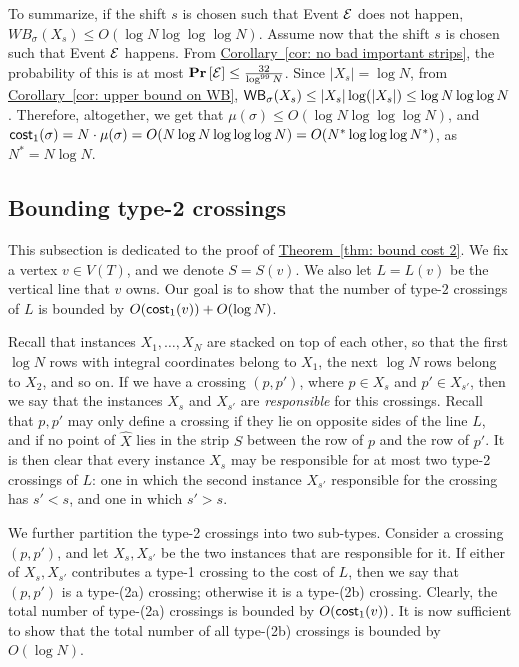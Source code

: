 \documentclass[11pt]{article}
\numberwithin{equation}{section}
\theoremstyle{definition}
\theoremstyle{plain}
\newcommand{\expref}[2]{\hyperref[#2]{#1~\ref{#2}}}
\begin{document}
To summarize, if the shift $s$ is chosen such that Event ${\cal{E}}$ does not happen,  	 $WB_{\sigma}(X_s)\leq O(\log N \log\log\log N)$. Assume now that the shift $s$ is chosen such that Event ${\cal{E}}$ happens. From \expref{Corollary}{cor: no bad important strips}, the probability of this is at most 	 $\text{\bf Pr}\left [{\cal{E}}\right]\leq \frac{32}{\log^{99}N}$. Since $|X_s|=\log N$, from \expref{Corollary}{cor: upper bound on WB}, $\mathsf{WB}_{\sigma}(X_s)\leq |X_s|\log(|X_s|)\leq \log N\log\log N$. Therefore, altogether, we get that $\mu(\sigma)\leq O(\log N\log\log\log N)$, and $\mathsf{cost}_1(\sigma)=N\cdot \mu(\sigma)=O(N\log N\log\log\log N)=O(N^*\log\log\log N^*)$, as $N^*=N\log N$.


%
%
%
\subsection{Bounding type-2 crossings}\label{subsec:type-2} 
%
%
%

This subsection is dedicated to the proof of \expref{Theorem}{thm: bound cost 2}. We fix a vertex $v\in V(T)$, and we denote $S=S(v)$. We also let $L = L(v)$ be the vertical line that $v$ owns. 
Our goal is to show that the number of type-$2$ crossings of $L$ is bounded by $O(\mathsf{cost}_1(v))+O(\log N)$.

Recall that instances $X_1,\ldots,X_N$ are stacked on top of each other, so that the first $\log N$ rows with integral coordinates  belong to $X_1$, the next $\log N$ rows belong to $X_2$, and so on. If we have a crossing $(p,p')$, where $p\in X_s$ and $p'\in X_{s'}$, then we say that the instances $X_s$ and $X_{s'}$ are \emph{responsible} for this crossings. Recall that $p,p'$ may only define a crossing if they lie on opposite sides of the line $L$, and if no point of $\hat X$ lies in the strip $S$ between the row of $p$ and the row of $p'$. It is then clear that every instance $X_s$ may be responsible for at most two type-2 crossings of $L$: one in which the second instance $X_{s'}$ responsible for the crossing has $s'<s$, and one in which $s'>s$.

We further partition the type-2 crossings into two sub-types. Consider a crossing $(p,p')$, and let $X_s,X_{s'}$ be the two instances that are responsible for it. If either of $X_s,X_{s'}$ contributes a type-1 crossing to the cost of $L$, then we say that $(p,p')$ is a type-(2a) crossing; otherwise it is a type-(2b) crossing. Clearly, the total number of type-(2a) crossings is bounded by $O(\mathsf{cost}_1(v))$. It is now sufficient to show that the total number of all type-(2b) crossings is bounded by $O(\log N)$.
\end{document}
